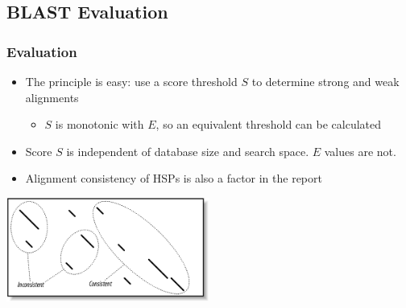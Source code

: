 %

\subsection{BLAST Evaluation}
\begin{frame}
  \frametitle{Evaluation}
  \begin{itemize}
    \item The principle is easy: use a score threshold $S$ to determine strong and weak alignments
    \begin{itemize}
      \item $S$ is monotonic with $E$, so an equivalent threshold can be calculated
    \end{itemize}
    \item Score $S$ is independent of database size and search space. $E$ values are not.
    \item Alignment consistency of HSPs is also a factor in the report
  \end{itemize}
  \begin{center}
    \includegraphics[width=0.5\textwidth]{images/consistency} 
  \end{center}    
\end{frame}
